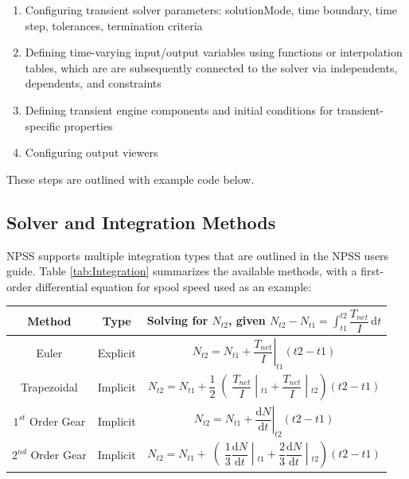 \documentclass[heading.tex]{subfiles}
\begin{document}
\begin{enumerate}
\item Configuring transient solver parameters: solutionMode, time boundary, time step, tolerances, termination criteria
\item Defining time-varying input/output variables using functions or interpolation tables,
which are are subsequently connected to the solver via independents, dependents, and constraints
\item Defining transient engine components and initial conditions for transient-specific properties
\item Configuring output viewers
\end{enumerate}

These steps are outlined with example code below.

\subsection{Solver and Integration Methods}
NPSS supports multiple integration types that are outlined in the NPSS users guide.
\cite[chap.~7.1]{NPSS} Table \ref{tab:Integration} summarizes the available methods, with a 
first-order differential equation for spool speed used as an example: 

\begin{minipage}{\linewidth}
\centering
\bigskip
{} \label{tab:Integration}
\begin{tabular}{|c|c|c|}
\hline 
Method & Type & Solving for  $N_{t2}$, given  $N_{t2}- N_{t1}= \int_{t1}^{t2} \! \dfrac{T_{net}}{I} \, \mathrm{d}t $\\ 
\hline 
Euler & Explicit & $ \left.N_{t2}= N_{t1} + \dfrac{T_{net}}{I} \right|_{t1}^{}(t2-t1)$ \\ 
\hline 
Trapezoidal & Implicit & $ \left.N_{t2}= N_{t1} + \dfrac{1}{2}\middle(\dfrac{T_{net}}{I} \middle|_{t1}^{}+\dfrac{T_{net}}{I} \middle|_{t2}^{}\right)(t2-t1)$ \\ 
\hline 
$1^{st}$ Order Gear & Implicit & $ \left.N_{t2}= N_{t1} + \dfrac{ \mathrm{d}N }{ \mathrm{d}t } \right|_{t2}^{}(t2-t1)$ \\ 
\hline 
$2^{nd}$ Order Gear & Implicit & $ \left.N_{t2}= N_{t1} + \middle(\dfrac{1}{3}\dfrac{ \mathrm{d}N }{ \mathrm{d}t }\middle|_{t1}^{}+\dfrac{2}{3}\dfrac{ \mathrm{d}N }{ \mathrm{d}t }\middle|_{t2}^{}\right)(t2-t1)$ \\ 
\hline 
\end{tabular} 
\end{minipage}
\end{document}
